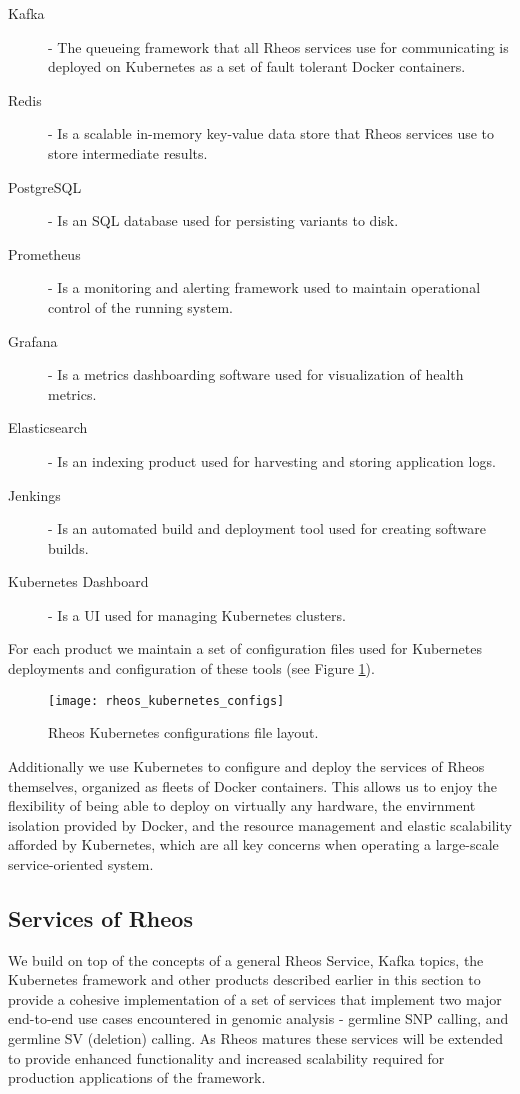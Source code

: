 \begin{description}
    \item [Kafka] - The queueing framework that all Rheos services use for communicating is deployed on Kubernetes as a set of fault tolerant Docker containers.
    \item [Redis] - Is a scalable in-memory key-value data store that Rheos services use to store intermediate results.
    \item [PostgreSQL] - Is an SQL database used for persisting variants to disk.
    \item [Prometheus] - Is a monitoring and alerting framework used to maintain operational control of the running system.
    \item [Grafana] - Is a metrics dashboarding software used for visualization of health metrics.
    \item [Elasticsearch] - Is an indexing product used for harvesting and storing application logs. 
    \item [Jenkings] - Is an automated build and deployment tool used for creating software builds.
    \item [Kubernetes Dashboard] - Is a UI used for managing Kubernetes clusters.
\end{description}

For each product we maintain a set of configuration files used for Kubernetes deployments and configuration of these tools (see Figure \ref{fig:rheos_kubernetes_configs}).

\begin{figure}[h!]
    \texttt{[image: rheos\_kubernetes\_configs]}
    \centering
    \caption {Rheos Kubernetes configurations file layout.}
    \label{fig:rheos_kubernetes_configs}
\end{figure}

Additionally we use Kubernetes to configure and deploy the services of Rheos themselves, organized as fleets of Docker containers. This allows us to enjoy the flexibility of being able to deploy on virtually any hardware, the envirnment isolation provided by Docker, and the resource management and elastic scalability afforded by Kubernetes, which are all key concerns when operating a large-scale service-oriented system.

\subsection{Services of Rheos}

We build on top of the concepts of a general Rheos Service, Kafka topics, the Kubernetes framework and other products described earlier in this section to provide a cohesive implementation of a set of services that implement two major end-to-end use cases encountered in genomic analysis - germline SNP calling, and germline SV (deletion) calling. As Rheos matures these services will be extended to provide enhanced functionality and increased scalability required for production applications of the framework. 

